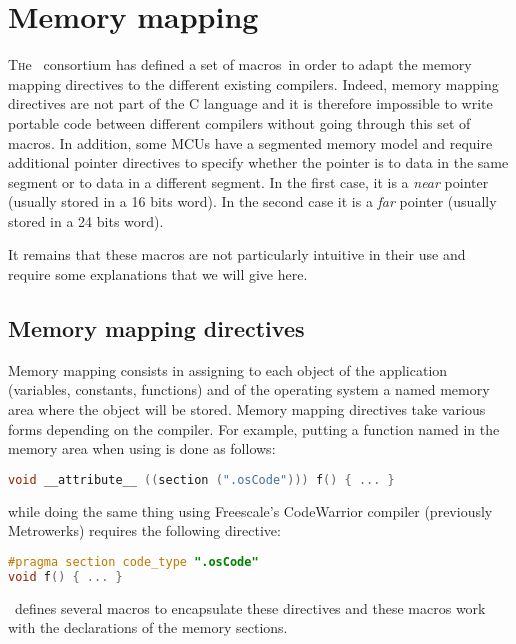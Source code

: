 
\chapter{Memory mapping}

\lettrine{T}he \autosar\ consortium has defined a set of macros\,\cite{autosar44CompilerAbstraction} in order to adapt the memory mapping directives to the different existing compilers. Indeed, memory mapping directives are not part of the C language and it is therefore impossible to write portable code between different compilers without going through this set of macros. In addition, some MCUs have a segmented memory model and require additional pointer directives to specify whether the pointer is to data in the same segment or to data in a different segment. In the first case, it is a \emph{near} pointer (usually stored in a 16 bits word). In the second case it is a \emph{far} pointer (usually stored in a 24 bits word).

It remains that these macros are not particularly intuitive in their use and require some explanations that we will give here.

\section{Memory mapping directives}

Memory mapping consists in assigning to each object of the application (variables, constants, functions) and of the operating system a named memory area where the object will be stored. Memory mapping directives take various forms depending on the compiler. For example, putting a function named  in the memory area  when using  is done as follows:

\begin{lstlisting}[language=C]
void __attribute__ ((section (".osCode"))) f() { ... }
\end{lstlisting}

while doing the same thing using Freescale's CodeWarrior compiler (previously Metrowerks) requires the following directive:

\begin{lstlisting}[language=C]
#pragma section code_type ".osCode"
void f() { ... }
\end{lstlisting}

\autosar\ defines several macros to encapsulate these directives and these macros work with the declarations of the memory sections.

